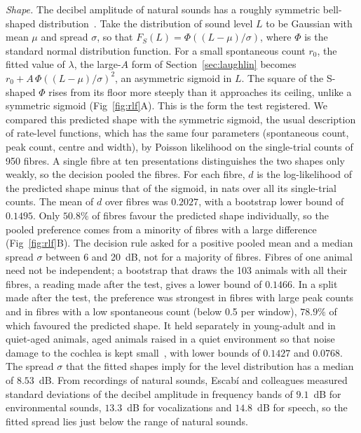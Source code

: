 \emph{Shape.} The decibel amplitude of natural sounds has a roughly symmetric bell-shaped distribution~\cite{Escabi2003}. Take the
distribution of sound level $L$ to be Gaussian with mean $\mu$ and spread $\sigma$, so that $F_S(L)=\Phi((L-\mu)/\sigma)$, where $\Phi$
is the standard normal distribution function. For a small spontaneous count $r_0$, the fitted value of $\lambda$, the large-$A$ form of Section~\ref{sec:laughlin}
becomes $r_0+A\,\Phi((L-\mu)/\sigma)^2$, an asymmetric sigmoid in $L$. The square of the S-shaped $\Phi$ rises from its floor more steeply than it
approaches its ceiling, unlike a symmetric sigmoid (Fig~\ref{fig:rlf}A). This is the form the test registered. We compared this predicted
shape with the symmetric sigmoid, the usual description of rate-level functions, which has the same four parameters (spontaneous count, peak count, centre and width),
by Poisson likelihood on the single-trial counts of 950 fibres. A single fibre at ten presentations distinguishes the two shapes only
weakly, so the decision pooled the fibres. For each fibre, $d$ is the log-likelihood of the predicted shape minus that of the sigmoid, in nats over all its
single-trial counts. The mean of $d$ over fibres was $0.2027$, with a bootstrap lower bound of $0.1495$. Only $50.8\%$ of fibres favour the predicted shape individually, so the pooled preference comes
from a minority of fibres with a large difference (Fig~\ref{fig:rlf}B). The decision rule asked for a positive pooled mean and
a median spread $\sigma$ between 6 and 20~dB, not for a majority of fibres. Fibres of one animal need not be independent; a
bootstrap that draws the 103 animals with all their fibres, a reading made after the test, gives a lower bound of $0.1466$. In a split made after the test, the preference was strongest in fibres with large peak counts and in fibres with a low
spontaneous count (below 0.5 per window), $78.9\%$ of which favoured the predicted shape. It held separately in young-adult and in quiet-aged animals, aged animals raised in a quiet
environment so that noise damage to the cochlea is kept small~\cite{Heeringa2024}, with lower bounds of $0.1427$ and $0.0768$. The
spread $\sigma$ that the fitted shapes imply for the level distribution has a median of $8.53$~dB. From recordings of natural sounds,
Escab\'i and colleagues measured standard deviations of the decibel amplitude in frequency bands of $9.1$~dB for environmental
sounds, $13.3$~dB for vocalizations and $14.8$~dB for speech, so the fitted spread lies just below the range of natural sounds.

